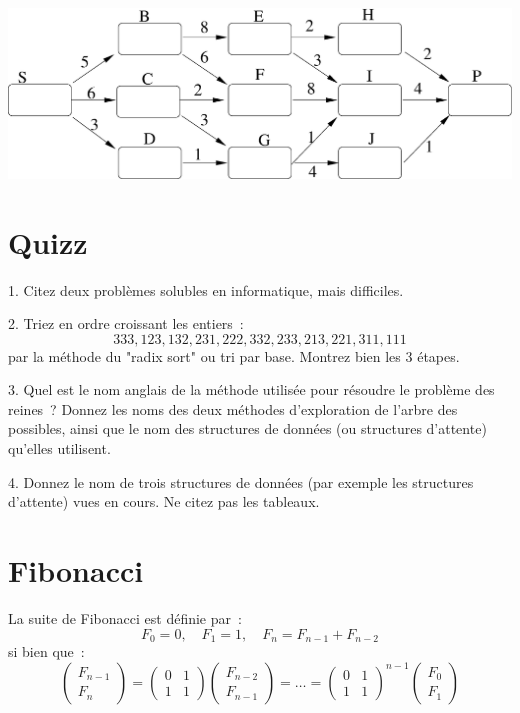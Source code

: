 \documentclass[11pt]{article}
\begin{document}
\begin{center}
\includegraphics[width=0.9\linewidth]{critic.eps}
\end{center}



 

\section{Quizz}


1. Citez deux problèmes solubles en informatique, mais difficiles.

2. Triez en ordre croissant les entiers~: 
$$
333, 123, 132, 231, 222, 332, 233, 213, 221, 311, 111
$$
par la méthode du "radix sort" ou tri par base. Montrez bien les 3 étapes.


3. Quel est le nom anglais de la méthode utilisée pour résoudre le problème des reines~? Donnez les noms des deux méthodes d'exploration de l'arbre des possibles, ainsi que le nom des structures de données (ou structures d'attente) qu'elles utilisent.

4. Donnez le nom de trois structures de données (par exemple les structures d'attente) vues en cours. Ne citez pas les tableaux.


\section{Fibonacci}
La suite de Fibonacci est définie par~:
$$F_0= 0, \quad F_1=1,\quad F_n= F_{n-1}+ F_{n-2}$$
si bien que~:
$$\left(\begin{array}{c}
F_{n-1} \\
F_n \end{array}\right)=
\left(\begin{array}{cc}
0 & 1 \\
1 & 1 \end{array}\right)\left(\begin{array}{c}F_{n-2} \\
F_{n-1} \end{array}\right)=\ldots =\left(\begin{array}{cc}
0 & 1 \\
1 & 1 \end{array}\right)^{n-1}\left(\begin{array}{c} 
F_0 \\
F_1 \end{array}\right)$$
\end{document}
